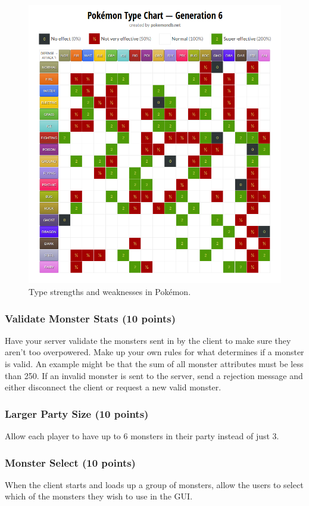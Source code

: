 \documentclass[11pt]{cselabheader}
\begin{document}
\begin{figure}[h]
  \centering
  \includegraphics[width=0.7\linewidth]{img/typechart}
  \caption{Type strengths and weaknesses in Pok\'emon.}
  \label{fig:types}
\end{figure}

\subsubsection{Validate Monster Stats (10 points)}
\label{subsubsec:valid}
Have your server validate the monsters sent in by the client to make sure they
aren't too overpowered. Make up your own rules for what determines if a monster
is valid. An example might be that the sum of all monster attributes must be less
than 250. If an invalid monster is sent to the server, send a rejection message
and either disconnect the client or request a new valid monster.

\subsubsection{Larger Party Size (10 points)}
Allow each player to have up to 6 monsters in their party instead of just 3.

\subsubsection{Monster Select (10 points)}
When the client starts and loads up a group of monsters, allow the users
to select which of the monsters they wish to use in the GUI.
\end{document}
